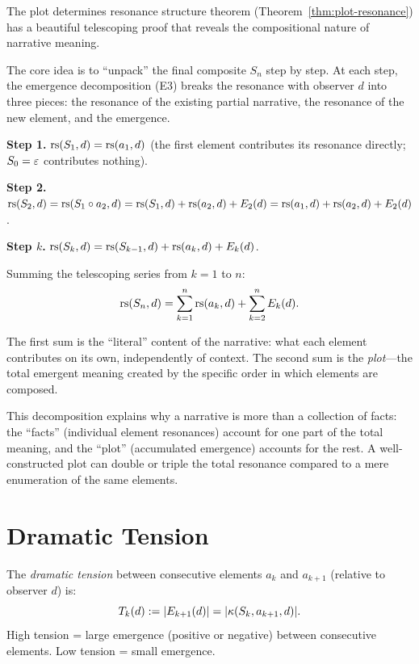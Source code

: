 \begin{remark}
\label{rem:plot-resonance-intuition}
The plot determines resonance structure theorem
(Theorem~\ref{thm:plot-resonance}) has a beautiful telescoping proof that
reveals the compositional nature of narrative meaning.

The core idea is to ``unpack'' the final composite $S_n$ step by step.
At each step, the emergence decomposition (E3) breaks the resonance with
observer $d$ into three pieces: the resonance of the existing partial
narrative, the resonance of the new element, and the emergence.

\textbf{Step 1.}  $\mathrm{rs}(S_1, d) = \mathrm{rs}(a_1, d)$ (the first element contributes
its resonance directly; $S_0 = \varepsilon$ contributes nothing).

\textbf{Step 2.}  $\mathrm{rs}(S_2, d) = \mathrm{rs}(S_1 \circ a_2, d) = \mathrm{rs}(S_1, d) +
\mathrm{rs}(a_2, d) + E_2(d) = \mathrm{rs}(a_1, d) + \mathrm{rs}(a_2, d) + E_2(d)$.

\textbf{Step $k$.}  $\mathrm{rs}(S_k, d) = \mathrm{rs}(S_{k-1}, d) + \mathrm{rs}(a_k, d) + E_k(d)$.

Summing the telescoping series from $k = 1$ to $n$:
\[
  \mathrm{rs}(S_n, d) = \sum_{k=1}^n \mathrm{rs}(a_k, d) + \sum_{k=2}^n E_k(d).
\]

The first sum is the ``literal'' content of the narrative: what each element
contributes on its own, independently of context.  The second sum is the
\emph{plot}---the total emergent meaning created by the specific order in
which elements are composed.

This decomposition explains why a narrative is more than a collection of
facts: the ``facts'' (individual element resonances) account for one part
of the total meaning, and the ``plot'' (accumulated emergence) accounts for
the rest.  A well-constructed plot can double or triple the total resonance
compared to a mere enumeration of the same elements.
\end{remark}


\section{Dramatic Tension}

\begin{definition}
\label{def:dramatic-tension}
The \emph{dramatic tension} between consecutive elements $a_k$ and $a_{k+1}$
(relative to observer $d$) is:
\[
  T_k(d) := |E_{k+1}(d)| = |\kappa(S_k, a_{k+1}, d)|.
\]
High tension = large emergence (positive or negative) between consecutive
elements.  Low tension = small emergence.
\end{definition}

